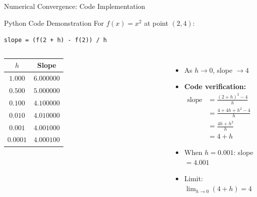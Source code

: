 \documentclass{beamer}
\begin{document}
\begin{frame}{Numerical Convergence: Code Implementation}
  \begin{block}{Python Code Demonstration}
    For $f(x) = x^2$ at point $(2, 4)$:
    \begin{center}
    \texttt{slope = (f(2 + h) - f(2)) / h}
    \end{center}
  \end{block}
  
  \begin{columns}
    \begin{table}
    \centering
    \begin{tabular}{|c|c|}
    \hline
    $h$ & Slope \\
    \hline
    $1.000$ & $6.000000$ \\
    $0.500$ & $5.000000$ \\
    $0.100$ & $4.100000$ \\
    $0.010$ & $4.010000$ \\
    $0.001$ & $4.001000$ \\
    $0.0001$ & $4.000100$ \\
    \hline
    \end{tabular}
    \end{table}
    
    \begin{itemize}
      \item<2-> As $h \to 0$, slope $\to 4$
      \item<3-> \textbf{Code verification:}
      \begin{align}
        \text{slope} &= \frac{(2+h)^2 - 4}{h} \\
        &= \frac{4 + 4h + h^2 - 4}{h} \\
        &= \frac{4h + h^2}{h} \\
        &= 4 + h
      \end{align}
      \item<4-> When $h = 0.001$: slope $= 4.001$
      \item<5-> Limit: $\lim_{h \to 0}(4 + h) = 4$
    \end{itemize}
  \end{columns}
\end{frame}
\end{document}
